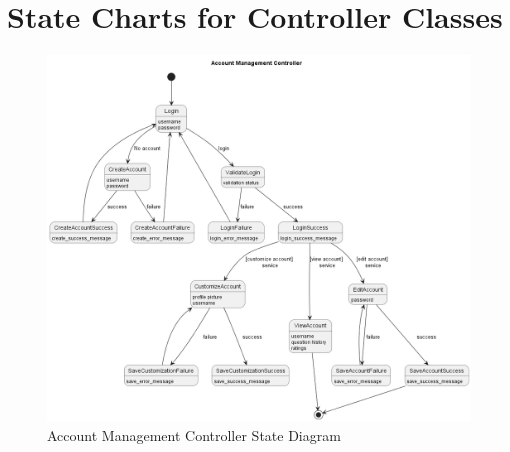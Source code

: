 \documentclass[]{article}
\numberwithin{figure}{section}
\begin{document}


\clearpage
\section{State Charts for Controller Classes}
\label{sec:state_charts_for_controller_classes}
\begin{figure}[h]
    \centering
    \includegraphics[width=1\textwidth]{diagrams/state/accountstate.png} %
    \caption{Account Management Controller State Diagram}
\end{figure}
\end{document}
